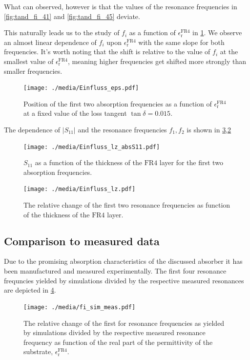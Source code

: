 What can observed, however is that the values of the resonance frequencies in \cref{fig:tand_fi_41} and \cref{fig:tand_fi_45} deviate. 

This naturally leads us to the study of $f_i$ as a function of $\epsilon_\mathrm{r}^\text{FR4}$ in \cref{fig:fi_epsr}. We observe an almost linear dependence of $f_i$ upon $\epsilon_\mathrm{r}^\text{FR4}$ with the same slope for both frequencies. It's worth noting that the shift is relative to the value of $f_i$ at the smallest value of $\epsilon_\mathrm{r}^\text{FR4}$, meaning higher frequencies get shifted more strongly than smaller frequencies. 

\begin{figure}
\centering
\texttt{[image: ./media/Einfluss\_eps.pdf]}
\caption{Position of the first two absorption frequencies as a function of $\epsilon_\mathrm{r}^\text{FR4}$ at a fixed value of the loss tangent $\tan\delta=0.015$.}
\label{fig:fi_epsr}
\end{figure}

The dependence of $|S_{11}|$ and the resonance frequencies $f_1, f_2$ is shown in \cref{fig:lz_fi},\cref{fig:lz_absS11}

\begin{figure}
\centering
\texttt{[image: ./media/Einfluss\_lz\_absS11.pdf]}
\caption{$S_{11}$ as a function of the thickness of the $\mathrm{FR4}$ layer for the first two absorption frequencies.}
\label{fig:lz_absS11}
\end{figure}
\begin{figure}
\centering
\texttt{[image: ./media/Einfluss\_lz.pdf]}
\caption{The relative change of the first two resonance frequencies as function of the thickness of the $\mathrm{FR4}$ layer.}
\label{fig:lz_fi}
\end{figure}

\subsection{Comparison to measured data}
Due to the promising absorption characteristics of the discussed absorber it has been manufactured and measured experimentally. The first four resonance frequncies yielded by simulations divided by the respective measured resonances are depicted in \cref{fig:sim_meas_vgl}.
\begin{figure}
\centering
\texttt{[image: ./media/fi\_sim\_meas.pdf]}
\caption{The relative change of the first for resonance frequencies as yielded by simulations divided by the respective measured resonance frequency as function of the real part of the permittivity of the substrate, $\epsilon_\mathrm{r}^\mathrm{FR4}$.}
\label{fig:sim_meas_vgl}
\end{figure}
